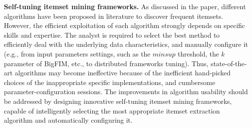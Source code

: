 \textbf{Self-tuning itemset mining frameworks.} 
As discussed in the paper, different algorithms have been proposed in literature
to discover frequent itemsets. 
However, the efficient exploitation of each algorithm strongly depends on specific skills and expertise. 
The analyst is required to select the best method to efficiently deal with the
underlying data characteristics, 
and manually configure it 
(e.g., from input parameters settings, such as the $minsup$ threshold, the $k$ parameter of BigFIM, etc., to distributed frameworks tuning).
Thus, state-of-the-art algorithms may become ineffective because of the inefficient hand-picked choices 
of the inappropriate specific implementations, and cumbersome parameter-configuration sessions.
The improvements in algorithm usability should be addressed by designing innovative self-tuning itemset mining 
frameworks, capable of intelligently selecting the most appropriate itemset extraction algorithm 
and automatically configuring it.




